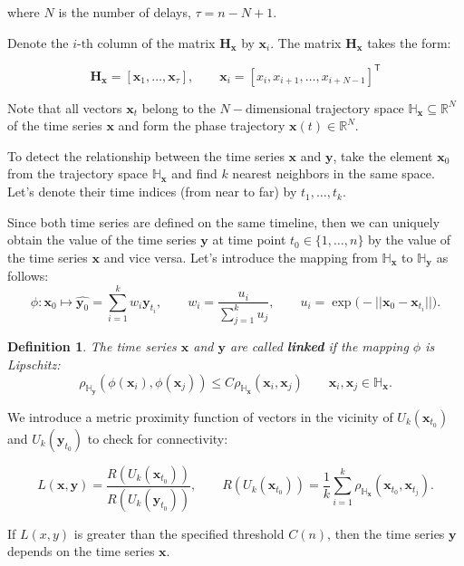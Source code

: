 \documentclass[bst/sn-mathphys]{sn-jnl}%
\newcommand{\bx}{\ensuremath{\mathbf{x}}}
\newcommand{\by}{\mathbf{y}}
\newcommand{\bH}{\mathbf{H}}
\newcommand{\dH}{\mathbb{H}}
\newcommand{\dR}{\mathbb{R}}
\renewcommand{\T}{^{\mathsf{T}}}
\theoremstyle{thmstyleone}%
\theoremstyle{thmstyletwo}%
\theoremstyle{thmstylethree}%
\newtheorem{definition}{Definition}%
\begin{document}
where $N$ is the number of delays, $\tau = n - N + 1$.

Denote the $i\text{-th}$ column of the matrix $\bH_{\bx}$ by $\bx_i$.
The matrix $\bH_{\bx}$ takes the form:

\begin{equation*}\label{eq:traj_mat_short}
	\bH_{\bx} = [\bx_1, \ldots, \bx_{\tau}], \qquad \bx_i = [x_i, x_{i+1}, \ldots, x_{i+N-1}] \T
\end{equation*}

Note that all vectors $\bx_t$ belong to the $N-\text{dimensional}$ trajectory space $\dH_{\bx} \subseteq \dR^N$ of the time series $\bx$ and form the phase trajectory $\bx(t) \in \dR^N$.

To detect the relationship between the time series $\bx$ and $\by$, take the element $\bx_0$ from the trajectory space $\dH_{\bx}$ and find $k$ nearest neighbors in the same space. 
Let's denote their time indices (from near to far) by $t_1, \ldots, t_k$.

Since both time series are defined on the same timeline, then we can uniquely obtain the value of the time series $\by$ at time point $t_0 \in \{1, \ldots, n\}$ by the value of the time series $\bx$ and vice versa.
Let's introduce the mapping from $\dH_{\bx}$ to $\dH_{\by}$ as follows:
$$ \phi: \bx_0 \mapsto \widehat{\by_0} = \sum\limits_{i=1}^k w_i \by_{t_i}, \qquad 
w_i = \dfrac{u_i}{\sum\limits_{j=1}^k u_j}, \qquad
u_i = \exp \bigl( -||\bx_0 - \bx_{t_i}|| \bigr).$$

\begin{definition}
	The time series $\bx$ and $\by$ are called \textbf{linked} if the mapping $\phi$ is Lipschitz:
	$$\rho_{\dH_{\by}}(\phi(\bx_i), \phi(\bx_j)) \leq C \rho_{\dH_{\bx}}(\bx_i, \bx_j) \qquad \bx_i, \bx_j \in \dH_{\bx}. $$
\end{definition}

We introduce a metric proximity function of vectors in the vicinity of $U_k(\bx_{t_0})$ and $U_k(\by_{t_0})$ to check for connectivity:

\begin{equation}
	L(\bx, \by) = \dfrac{R(U_k(\bx_{t_0}))}{R(U_k(\by_{t_0}))}, \qquad R(U_k(\bx_{t_0})) = \dfrac{1}{k} \sum\limits_{i=1}^k \rho_{\dH_{\bx}}(\bx_{t_0}, \bx_{t_j}).
\end{equation}

If $L(x,y)$ is greater than the specified threshold $C(n)$, then the time series $\by$ depends on the time series $\bx$.
\end{document}
